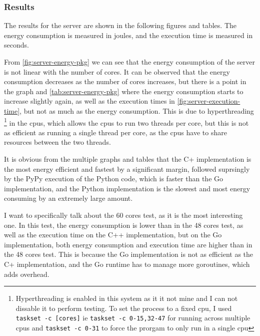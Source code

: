 \subsubsection{Results}

The results for the server are shown in the following figures and tables. The energy consumption is measured in joules, and the execution time is measured in seconds. 








From \autoref{fig:server-energy-pkg} we can see that the energy consumption of the server is not linear with the number of cores. It can be observed that the energy consumption decreases as the number of cores increases, but there is a point in the graph and \autoref{tab:server-energy-pkg} where the energy consumption starts to increase slightly again, as well as the execution times in \autoref{fig:server-execution-time}, but not as much as the energy consumption. 
This is due to hyperthreading \footnote{Hyperthreading is enabled in this system as it it not mine and I can not dissable it to perform testing. To set the process to a fixed \gls{cpu}, I used \texttt{taskset -c [cores]} ie \texttt{taskset -c 0-15,32-47} for running across multiple \glspl{cpu} and \texttt{taskset -c 0-31} to force the prorgam to only run in a single \gls{cpu}} in the \glspl{cpu}, which allows the \glspl{cpu} to run two threads per core, but this is not as efficient as running a single thread per core, as the \glspl{cpu} have to share resources between the two threads.

It is obvious from the multiple graphs and tables that the C\++ implementation is the most energy efficient and fastest by a significant margin, followed suprsingly by the PyPy execution of the Python code, which is faster than the Go implementation, and the Python implementation is the slowest and most energy consuming by an extremely large amount.

I want to specifically talk about the 60 cores test, as it is the most interesting one. In this test, the energy consumption is lower than in the 48 cores test, as well as the execution time on the C++ implementation, but on the Go implementation, both energy consumption and execution time are higher than in the 48 cores test. This is because the Go implementation is not as efficient as the C\++ implementation, and the Go runtime has to manage more goroutines, which adds overhead. 

